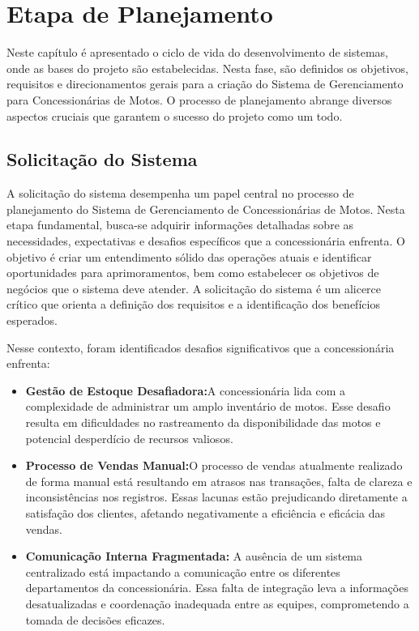 
\chapter{Etapa de Planejamento}


Neste capítulo é apresentado o ciclo de vida do desenvolvimento de sistemas, onde as bases do projeto são estabelecidas. Nesta fase, são definidos os objetivos, requisitos e direcionamentos gerais para a criação do Sistema de Gerenciamento para Concessionárias de Motos. O processo de planejamento abrange diversos aspectos cruciais que garantem o sucesso do projeto como um todo.


\section{Solicita\c{c}\~{a}o do Sistema}
A solicitação do sistema desempenha um papel central no processo de planejamento do Sistema de Gerenciamento de Concessionárias de Motos. Nesta etapa fundamental, busca-se adquirir informações detalhadas sobre as necessidades, expectativas e desafios específicos que a concessionária enfrenta. O objetivo é criar um entendimento sólido das operações atuais e identificar oportunidades para aprimoramentos, bem como estabelecer os objetivos de negócios que o sistema deve atender. A solicitação do sistema é um alicerce crítico que orienta a definição dos requisitos e a identificação dos benefícios esperados.

Nesse contexto, foram identificados desafios significativos que a concessionária enfrenta:

\begin{itemize}
\item \textbf{Gestão de Estoque Desafiadora:}A concessionária lida com a complexidade de administrar um amplo inventário de motos. Esse desafio resulta em dificuldades no rastreamento da disponibilidade das motos e potencial desperdício de recursos valiosos.

\item \textbf{Processo de Vendas Manual:}O processo de vendas atualmente realizado de forma manual está resultando em atrasos nas transações, falta de clareza e inconsistências nos registros. Essas lacunas estão prejudicando diretamente a satisfação dos clientes, afetando negativamente a eficiência e eficácia das vendas.

\item \textbf{Comunicação Interna Fragmentada:} A ausência de um sistema centralizado está impactando a comunicação entre os diferentes departamentos da concessionária. Essa falta de integração leva a informações desatualizadas e coordenação inadequada entre as equipes, comprometendo a tomada de decisões eficazes.\\
\end{itemize}

